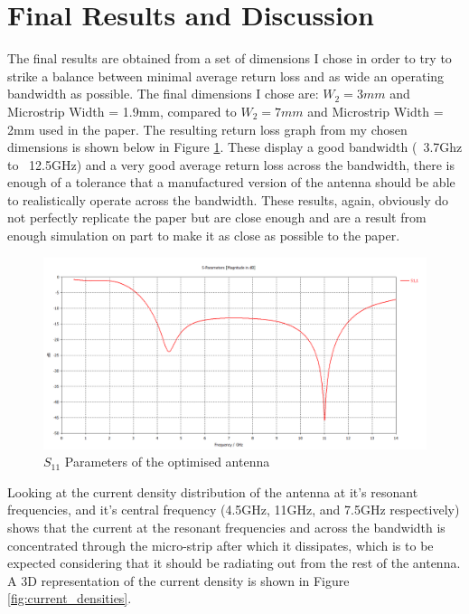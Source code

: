 \documentclass[colorlinks,11pt,a4paper,normalphoto,withhyper,ragged2e]{altareport}
\begin{document}
\section{Final Results and Discussion}
The final results are obtained from a set of dimensions I chose in order to try to strike a balance between minimal average return loss and as wide an operating bandwidth as possible. The final dimensions I chose are: $W_2=3mm$ and Microstrip Width = 1.9mm, compared to $W_2=7mm$ and Microstrip Width = 2mm used in the paper. The resulting return loss graph from my chosen dimensions is shown below in Figure \ref{fig:s11_optimised}. These display a good bandwidth (~3.7Ghz to ~12.5GHz) and a very good average return loss across the bandwidth, there is enough of a tolerance that a manufactured version of the antenna should be able to realistically operate across the bandwidth. \linebreak
These results, again, obviously do not perfectly replicate the paper but are close enough and are a result from enough simulation on part to make it as close as possible to the paper. \linebreak 


\begin{figure}[ht]
	\centering
	\hspace{\fill}\includegraphics[width=14cm,valign=c]{Images/S1,1-optimised-values.png}\hspace{\fill}
	\caption{$S_{11}$ Parameters of the optimised antenna}  %
	\label{fig:s11_optimised}
\end{figure}


\newpage


Looking at the current density distribution of the antenna at it's resonant frequencies, and it's central frequency (4.5GHz, 11GHz, and 7.5GHz respectively) shows that the current at the resonant frequencies and across the bandwidth is concentrated through the micro-strip after which it dissipates, which is to be expected considering that it should be radiating out from the rest of the antenna. A 3D representation of the current density is shown in Figure \ref{fig:current_densities}. \linebreak
\end{document}
